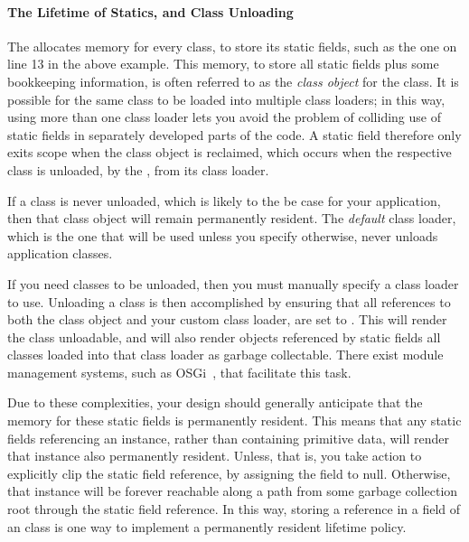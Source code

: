 
\paragraph{The Lifetime of Statics, and Class Unloading}

The \jre allocates memory for every class, to store its static fields, such as
the one on line 13 in the above example. This memory, to store all static fields
plus some bookkeeping information, is often referred to as the \emph{class
object} for the class. It is possible for the same class to
be loaded into multiple class loaders; in this way, using more than one class
loader lets you avoid the problem of colliding use of static fields in separately
developed parts of the code. A static field therefore only exits scope when the
class object is reclaimed, which occurs when the respective class is unloaded, by
the \jre, from its class loader. 

If a class is never unloaded, which is likely to the be case for your
application, then that class object will remain permanently resident. The
\emph{default} class loader, which is the one that will be used unless you
specify otherwise, never unloads application classes. 

If you need classes to be unloaded, then you must manually specify a class loader
to use. Unloading a class is then accomplished by ensuring that all references to
both the class object and your custom class loader, are set to . This
will render the class unloadable, and will also render objects referenced by
static fields all classes loaded into that class loader as garbage collectable.
There exist module management systems, such as OSGi~\cite{OSGi_2007}, that
facilitate this task.

Due to these complexities, your design should generally anticipate that the
memory for these static fields is permanently resident. This means that any
static fields referencing an instance, rather than containing primitive data,
will render that instance also permanently resident. Unless, that is, you take
action to explicitly clip the static field reference, by assigning the field to
null. Otherwise, that instance will be forever reachable along a path from some
garbage collection root through the static field reference. In this way, storing
a reference in a  field of an class is one way to implement a
permanently resident lifetime policy.



